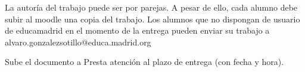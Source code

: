 La autoría del trabajo puede ser por parejas. A pesar de ello, cada alumno debe subir al moodle una copia del trabajo. Los alumnos que no dispongan de usuario de educamadrid en el momento de la entrega pueden enviar su trabajo a alvaro.gonzalezsotillo@educa.madrid.org


Sube el documento a 
Presta atención al plazo de entrega (con fecha y hora).
  






